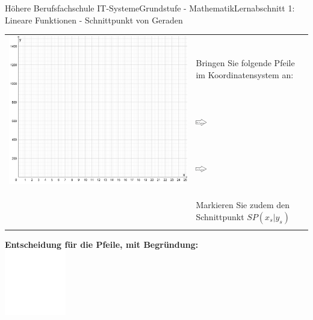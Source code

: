 \documentclass[oneside,openany,headings=optiontotoc,11pt,numbers=noenddot]{scrreprt}
\begin{document}
\begin{worksheet}{Höhere Berufsfachschule IT-Systeme}{Grundstufe - Mathematik}{Lernabschnitt 1: Lineare Funktionen - Schnittpunkt von Geraden}
\begin{tabularx}{1.25\textwidth}{X|L{3cm}|}
			 & Bringen Sie folgende Pfeile im Koordinatensystem an:\\
			& \includegraphics[width=0.1\textwidth,align=b]{../99_Bilder/arrow-x.png}\\
			& \\
			& \includegraphics[width=0.1\textwidth,align=b]{../99_Bilder/arrow-y.png}\\
			& \\
			\\
			& \\
			& Markieren Sie zudem den Schnittpunkt \(SP(x_s|y_s)\)\\
			& \\
		\end{tabularx}
		\newpage
		\begin{framed}
			\noindent
			\textbf{Entscheidung für die Pfeile, mit Begründung:}\\
			\includegraphics[width=0.2\textwidth]{../../empty.jpg}

\end{framed}
\end{worksheet}
\end{document}
